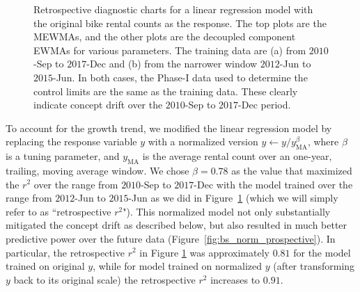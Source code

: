 \documentclass[twoside,11pt]{article}
\begin{document}
\begin{figure}[H]
\begin{subfigure}[t]{0.4\linewidth}
     \captionsetup{width=.95\linewidth}
     \caption{}
     \label{fig:bs_retro_narrow_train}
\end{subfigure}
\caption{Retrospective diagnostic charts for a linear regression model with the original bike rental counts as the response. The top plots are the MEWMAs, and the other plots are the decoupled component EWMAs for various parameters. The training data are (a) from $2010$-Sep to $2017$-Dec and (b) from the narrower window $2012$-Jun to $2015$-Jun. In both cases, the Phase-I data used to determine the control limits are the same as the training data. These clearly indicate concept drift over the $2010$-Sep to $2017$-Dec period.}
\label{fig:bike_sharing}
\end{figure}

To account for the growth trend, we modified the linear regression model by replacing the response variable $y$ with a normalized version  $y \leftarrow y/y_{\mathrm{MA}}^\beta$, where $\beta$ is a tuning parameter, and $y_{\mathrm{MA}}$ is the average rental count over an one-year, trailing, moving average window. We chose $\beta=0.78$ as the value that maximized the $r^2$ over the range from $2010$-Sep to $2017$-Dec with the model trained over the range from $2012$-Jun to $2015$-Jun as we did in Figure~\ref{fig:bs_retro_narrow_train} (which we will simply refer to as ``retrospective $r^2$"). %
This normalized model not only substantially mitigated the concept drift as described below, but also resulted in much better predictive power over the future data (Figure~\ref{fig:bs_norm_prospective}). In particular, the retrospective $r^2$ in Figure \ref{fig:bs_retro_narrow_train} was approximately $0.81$ for the model trained on original $y$, while for model trained on normalized $y$ (after transforming $y$ back to its original scale) the retrospective $r^2$ increases to $0.91$. %
\end{document}
